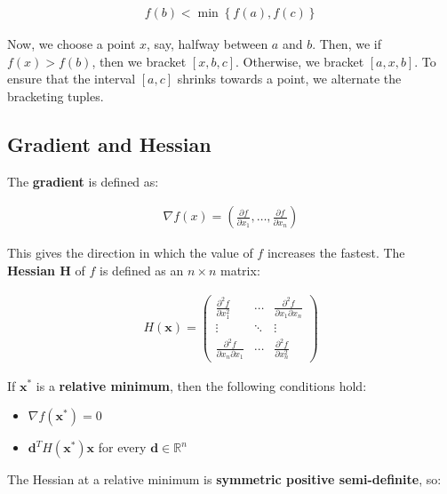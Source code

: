 \documentclass[11pt]{article}
\begin{document}
\begin{align*}
    f\left(b\right) < \min \left\lbrace f\left(a\right),f\left(c\right) \right\rbrace
\end{align*}

Now, we choose a point \(x\), say, halfway between \(a\) and \(b\). Then, we if \(f\left(x\right) > f\left(b\right)\), then we bracket \(\left[x,b,c\right]\). Otherwise, we bracket \(\left[a,x,b\right]\). To ensure that the interval \(\left[a,c\right]\) shrinks towards a point, we alternate the bracketing tuples.

\subsection{Gradient and Hessian}
\label{sec:org98a157d}
The \textbf{gradient} is defined as:

\begin{align*}
    \nabla f\left(x\right) = \left( \frac{\partial f}{\partial x_{1}}, \ldots, \frac{\partial f}{\partial x_{n}} \right)
\end{align*}

This gives the direction in which the value of \(f\) increases the fastest. The \textbf{Hessian H} of \(f\) is defined as an \(n \times n\) matrix:

\begin{align*}
    H\left(\boldsymbol{x}\right) =
    \begin{pmatrix}
        \frac{\partial^{2}f}{\partial x_{1}^{2}} & \cdots & \frac{\partial^{2}f}{\partial x_{1} \partial x_{n}} \\
        \vdots & \ddots & \vdots \\
        \frac{\partial^{2}f}{\partial x_{n} \partial x_{1}} & \cdots & \frac{\partial^{2}f}{\partial x_{n}^{2}}
    \end{pmatrix}
\end{align*}

If \(\boldsymbol{x}^{*}\) is a \textbf{relative minimum}, then the following conditions hold:

\begin{itemize}
    \item $\nabla f\left(\boldsymbol{x}^{*}\right) = 0$
    \item $\boldsymbol{d}^{T}H\left(\boldsymbol{x}^{*}\right)\boldsymbol{x}$ for every $\boldsymbol{d} \in \mathbb{R}^{n}$
\end{itemize}

The Hessian at a relative minimum is \textbf{symmetric positive semi-definite}, so:
\end{document}

